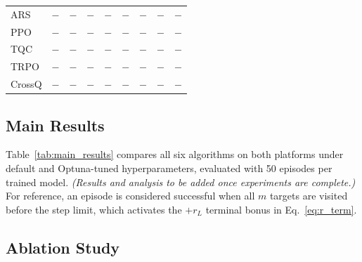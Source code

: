 \documentclass{article}
\begin{document}
\begin{table}[tbp]
\begin{minipage}[t]{0.49\linewidth}
{\begin{tabular}{l|cccc|cccc}
    ARS    & $-$ & $-$ & $-$ & $-$ & $-$ & $-$ & $-$ & $-$ \\
    PPO    & $-$ & $-$ & $-$ & $-$ & $-$ & $-$ & $-$ & $-$ \\
    TQC    & $-$ & $-$ & $-$ & $-$ & $-$ & $-$ & $-$ & $-$ \\
    TRPO   & $-$ & $-$ & $-$ & $-$ & $-$ & $-$ & $-$ & $-$ \\
    CrossQ & $-$ & $-$ & $-$ & $-$ & $-$ & $-$ & $-$ & $-$ \\
    \bottomrule
\end{tabular}}
\end{minipage}
\vspace{-6pt}
\end{table}

\subsection{Main Results}
\label{sec:exp:main}

Table~\ref{tab:main_results} compares all six algorithms on both platforms under default and Optuna-tuned hyperparameters, evaluated with 50 episodes per trained model. \textit{(Results and analysis to be added once experiments are complete.)} For reference, an episode is considered successful when all $m$ targets are visited before the step limit, which activates the $+r_L$ terminal bonus in Eq.~\eqref{eq:r_term}.


\subsection{Ablation Study}
\label{sec:exp:ablation}
\end{document}
